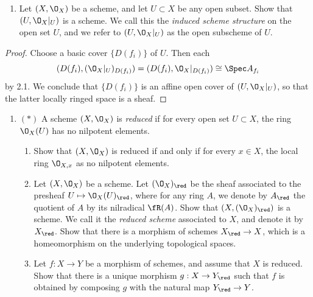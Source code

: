 \documentclass[12pt]{amsart}
\begin{document}
\begin{enumerate}
	\item[2.2.] {
      Let $(X,\O_X)$ be a scheme, and let $U\subset X$ be any open subset.
      Show that $(U,\O_X|_U)$ is a scheme.
      We call this the \emph{induced scheme structure} on the open set $U$, and we refer to $(U,\O_X|_U)$ as the open subscheme of $U$.
    }
\end{enumerate}

\begin{proof}
  Choose a basic cover $\{D(f_i)\}$ of $U$. 
  Then each 
  \[
    (D(f_i),(\O_X|_U)_{D(f_i)})= (D(f_i),\O_X|_{D(f_i)})\cong\Spec A_{f_i}
  \]
  by 2.1. 
  We conclude that $\{D(f_i)\}$ is an affine open cover of $(U,\O_X|_U)$, so that the latter locally ringed space is a sheaf.
\end{proof}


\begin{enumerate}
	\item[2.3.] {
      $(*)$ A scheme $(X,\O_X)$ is \emph{reduced} if for every open set $U\subset X$, the ring $\O_X(U)$ has no nilpotent elements.
      \begin{enumerate}
        \item Show that $(X,\O_X)$ is reduced if and only if for every $x\in X$, the local ring $\O_{X,x}$ as no nilpotent elements.
        \item Let $(X,\O_X)$ be a scheme.
          Let $(\O_X)_{\red}$ be the sheaf associated to the presheaf $U\mapsto \O_X(U)_{\red}$, where for any ring $A$, we denote by $A_{\red}$ the quotient of $A$ by its nilradical $\fR(A)$. 
          Show that $(X,(\O_X)_{\red})$ is a scheme.
          We call it the \emph{reduced scheme} associated to $X$, and denote it by $X_{\red}$.
          Show that there is a morphism of schemes $X_{\red}\to X$, which is a homeomorphism on the underlying topological spaces.
        \item Let $f:X\to Y$ be a morphism of schemes, and assume that $X$ is reduced.
          Show that there is a unique morphism $g:X\to Y_{\red}$ such that $f$ is obtained by composing $g$ with the natural map $Y_{\red}\to Y$.
      \end{enumerate}
    }
\end{enumerate}
\end{document}
